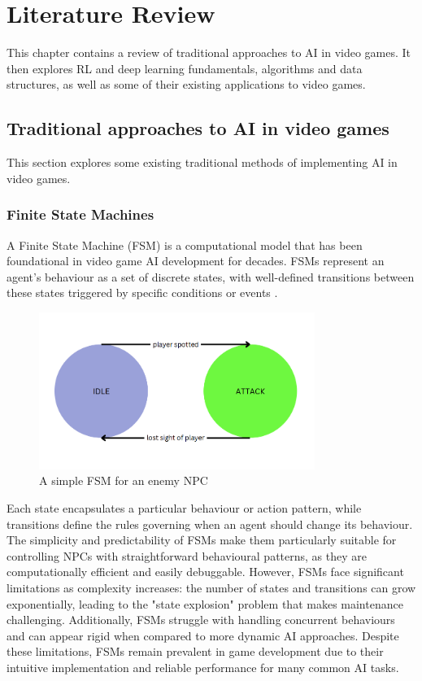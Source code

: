 \chapter{Literature Review}

This chapter contains a review of traditional approaches to AI in video games.
It then explores RL and deep learning fundamentals, algorithms and data structures, as well as some of their existing applications to video games.

\section{Traditional approaches to AI in video games}

This section explores some existing traditional methods of implementing AI in video games.

\subsection{Finite State Machines}

A Finite State Machine (FSM) is a computational model that has been foundational in video game AI development for decades. 
FSMs represent an agent's behaviour as a set of discrete states, with well-defined transitions between these states triggered by specific conditions or events \cite{spiceworks_fsm}. 

\begin{figure}[H]
    \centering
    \includegraphics[width=0.8\textwidth]{figures/fsm_example.png}
    \caption{A simple FSM for an enemy NPC}
    \label{fig:fsm}
\end{figure}

Each state encapsulates a particular behaviour or action pattern, while transitions define the rules governing when an agent should change its behaviour. 
The simplicity and predictability of FSMs make them particularly suitable for controlling NPCs with straightforward behavioural patterns, as they are computationally efficient and easily debuggable.
However, FSMs face significant limitations as complexity increases: the number of states and transitions can grow exponentially, leading to the "state explosion" problem that makes maintenance challenging.
Additionally, FSMs struggle with handling concurrent behaviours and can appear rigid when compared to more dynamic AI approaches. 
Despite these limitations, FSMs remain prevalent in game development due to their intuitive implementation and reliable performance for many common AI tasks.

